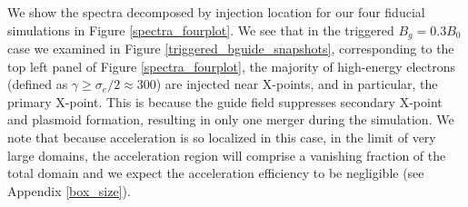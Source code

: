 We show the spectra decomposed by injection location for our four fiducial simulations in Figure \ref{spectra_fourplot}.  We see that in the triggered $B_{g}=0.3B_{0}$ case we examined in Figure \ref{triggered_bguide_snapshots}, corresponding to the top left panel of Figure \ref{spectra_fourplot}, the majority of high-energy electrons (defined as $\gamma \geq \sigma_{e}/2 \approx 300$) are injected near X-points, and in particular, the primary X-point.  This is because the guide field suppresses secondary X-point and plasmoid formation, resulting in only one merger during the simulation.  We note that because acceleration is so localized in this case, in the limit of very large domains, the acceleration region will comprise a vanishing fraction of the total domain and we expect the acceleration efficiency to be negligible (see Appendix \ref{box_size}).  

